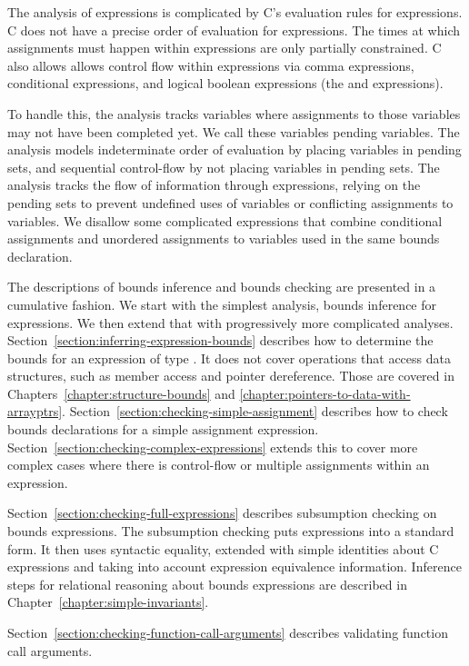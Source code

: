 The analysis of expressions is complicated by C's evaluation
rules for expressions.  C does not have a precise order of evaluation
for expressions.  The times at which assignments
must happen within expressions are only partially constrained.
C also allows allows control flow within 
expressions via comma expressions, conditional expressions, and
logical boolean expressions (the \code{&&} and \code{||} expressions).

To handle this, the analysis tracks variables where assignments
to those variables may not have been completed yet.  We call these
variables pending variables.  The analysis models indeterminate order
of evaluation by placing variables in pending sets, and sequential
control-flow by not placing variables in pending sets.  The analysis
tracks the flow of information through expressions, relying on the
pending sets to prevent undefined uses of variables or conflicting
assignments to variables.  We disallow some complicated expressions
that combine conditional assignments and unordered assignments
to variables used in the same bounds declaration.

The descriptions of bounds inference and bounds checking are
presented in a cumulative fashion.  We start with the simplest
analysis, bounds inference for expressions.  We then extend that
with progressively more complicated analyses.
Section~\ref{section:inferring-expression-bounds}
describes how to determine the bounds for an expression of type \arrayptr.
It does not cover operations that access data structures, such as member
access and pointer dereference. 
Those are covered in Chapters~\ref{chapter:structure-bounds} and 
\ref{chapter:pointers-to-data-with-arrayptrs}.
Section~\ref{section:checking-simple-assignment} describes
how to check bounds declarations for a simple assignment
expression.
Section~\ref{section:checking-complex-expressions}
extends this to cover more complex cases where there is control-flow
or multiple assignments within an expression.

Section~\ref{section:checking-full-expressions} describes
subsumption checking on bounds expressions.   The subsumption checking
puts expressions into a standard form.  It then uses syntactic equality,
extended with simple identities about C expressions and taking into account expression
equivalence information.
Inference steps for relational reasoning about bounds expressions 
are described in Chapter~\ref{chapter:simple-invariants}.

Section~\ref{section:checking-function-call-arguments}
describes validating function call arguments.

